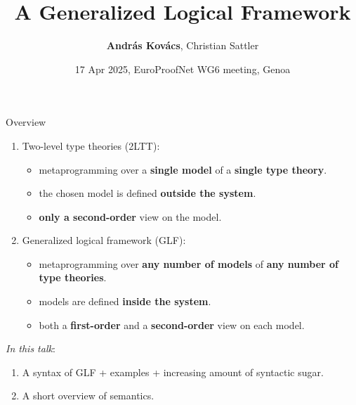 \documentclass[dvipsnames,aspectratio=169]{beamer}
\title{A Generalized Logical Framework}
\author{\textbf{András Kovács\inst{1}},\,\,Christian Sattler\inst{1}}
\institute{
  \inst{1}%
       {University of Gothenburg \& Chalmers University of Technology}
}
\date{17 Apr 2025, EuroProofNet WG6 meeting, Genoa}
\begin{document}
\frame{\titlepage}

\begin{frame}{Overview}

\begin{enumerate}
\item Two-level type theories (2LTT):
  \begin{itemize}
    \item metaprogramming over a \textbf{single model} of a \textbf{single type theory}.
    \pause
    \item the chosen model is defined \textbf{outside the system}.
    \pause
    \item \textbf{only a second-order} view on the model.
  \end{itemize}
\pause
\item Generalized logical framework (GLF):
  \begin{itemize}
    \item metaprogramming over \textbf{any number of models} of \textbf{any number of type theories}.
    \item models are defined \textbf{inside the system}.
    \item both a \textbf{first-order} and a \textbf{second-order} view on each model.
  \end{itemize}
\end{enumerate}
\pause
\vspace{1em}

\emph{In this talk}:
\begin{enumerate}
\item A syntax of GLF + examples + increasing amount of syntactic sugar.
\item A short overview of semantics.
\end{enumerate}

\end{frame}
\end{document}
